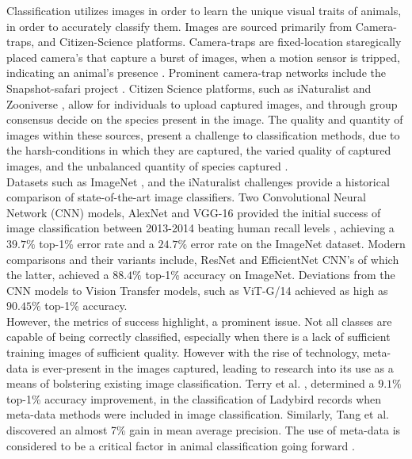 \documentclass[conference]{IEEEtran}
\begin{document}
    Classification utilizes images in order to learn the unique visual traits of animals, in order to accurately classify them. Images are sourced primarily from Camera-traps, and Citizen-Science platforms. Camera-traps are fixed-location staregically placed camera's that capture a burst of images, when a motion sensor is tripped, indicating an animal's presence \cite{Schneider_Greenberg_Taylor_Kremer_2020}. Prominent camera-trap networks include the Snapshot-safari project \cite{snapshot_safari}. Citizen Science platforms, such as iNaturalist \cite{iNaturalist} and Zooniverse \cite{zooniverse.org}, allow for individuals to upload captured images, and through group consensus decide on the species present in the image. 
    The quality and quantity of images within these sources, present a challenge to classification methods, due to the harsh-conditions in which they are captured, the varied quality of captured images, and the unbalanced quantity of species captured \cite{Van_Horn_Mac_Aodha_Song_Cui_Sun_Shepard_Adam_Perona_Belongie_2018b}. 
    \\

    Datasets such as ImageNet \cite{ImageNet}, and the iNaturalist challenges \cite{Van_Horn_Mac_Aodha_Song_Cui_Sun_Shepard_Adam_Perona_Belongie_2018b} provide a historical comparison of state-of-the-art image classifiers. Two Convolutional Neural Network (CNN) models, AlexNet \cite{Krizhevsky_Sutskever_Hinton_2017a} and VGG-16 \cite{Simonyan2014-ww} provided the initial success of image classification between 2013-2014 beating human recall levels \cite{Wäldchen_Mäder_2018}, achieving a $39.7\%$ top-1\% error rate and a $24.7\%$ error rate on the ImageNet dataset. Modern comparisons and their variants include, ResNet \cite{He_Zhang_Ren_Sun_2016} and EfficientNet \cite{Tan2019} CNN's of which the latter, achieved a $88.4\%$ top-1\% accuracy on ImageNet. Deviations from the CNN models to Vision Transfer models, such as ViT-G/14 \cite{Zhai_Kolesnikov_Houlsby_Beyer_2022} achieved as high as $90.45\%$ top-1\% accuracy.
    \\ 

    However, the metrics of success highlight, a prominent issue. Not all classes are capable of being correctly classified, especially when there is a lack of sufficient training images of sufficient quality. However with the rise of technology, meta-data is ever-present in the images captured, leading to research into its use as a means of bolstering existing image classification. 
    Terry et al. \cite{Terry_Roy_August_2019}, determined a $9.1\%$ top-1\% accuracy improvement, in the classification of Ladybird records when meta-data methods were included in image classification. Similarly, Tang et al. \cite{tang_paluri_fei-fei_fergus_bourdev_2015} discovered an almost 7\% gain in mean average precision. The use of meta-data is considered to be a critical factor in animal classification going forward \cite{Wäldchen_Mäder_2018}. 
    \\
\end{document}
